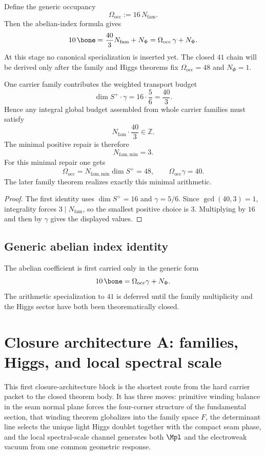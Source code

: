 \begin{remark}
Define the generic occupancy
\[
\Omega_{\mathrm{occ}}:=16\,N_{\mathrm{fam}}.
\]
Then the abelian-index formula gives
\[
10\,\bone
=
\frac{40}{3}N_{\mathrm{fam}}+N_\Phi
=
\Omega_{\mathrm{occ}}\,\gamma+N_\Phi.
\]
At this stage no canonical specialization is inserted yet. The closed $41$ chain will be derived
only after the family and Higgs theorems fix $\Omega_{\mathrm{occ}}=48$ and $N_\Phi=1$.
\end{remark}

\begin{corollary}
\label{cor:family-integrality-repair}
One carrier family contributes the weighted transport budget
\[
\dim S^+\cdot\gamma
=
16\cdot\frac56
=
\frac{40}{3}.
\]
Hence any integral global budget assembled from whole carrier families must satisfy
\[
N_{\mathrm{fam}}\cdot \frac{40}{3}\in\mathbb Z.
\]
The minimal positive repair is therefore
\[
N_{\mathrm{fam,min}}=3.
\]
For this minimal repair one gets
\[
\Omega_{\mathrm{occ}}=N_{\mathrm{fam,min}}\dim S^+=48,
\qquad
\Omega_{\mathrm{occ}}\gamma=40.
\]
The later family theorem realizes exactly this minimal arithmetic.
\end{corollary}

\begin{proof}
The first identity uses $\dim S^+=16$ and $\gamma=5/6$. Since $\gcd(40,3)=1$, integrality forces
$3\mid N_{\mathrm{fam}}$, so the smallest positive choice is $3$. Multiplying by $16$ and then by
$\gamma$ gives the displayed values.
\end{proof}

\subsection{Generic abelian index identity}

The abelian coefficient is first carried only in the generic form
\begin{equation}
\label{eq:41-chain-main}
10\,\bone
=
\Omega_{\mathrm{occ}}\gamma+N_\Phi.
\end{equation}
The arithmetic specialization to $41$ is deferred until the family multiplicity and the Higgs
sector have both been theorematically closed.


\section{Closure architecture A: families, Higgs, and local spectral scale}

This first closure-architecture block is the shortest route from the hard carrier packet to the
closed theorem body. It has three moves: primitive winding balance in the seam normal plane forces
the four-corner structure of the fundamental section, that winding theorem globalizes into the
family space $F$, the determinant line selects the unique light Higgs doublet together with the
compact seam phase, and the local spectral-scale channel generates both $\Mpl$ and the electroweak
vacuum from one common geometric response.

